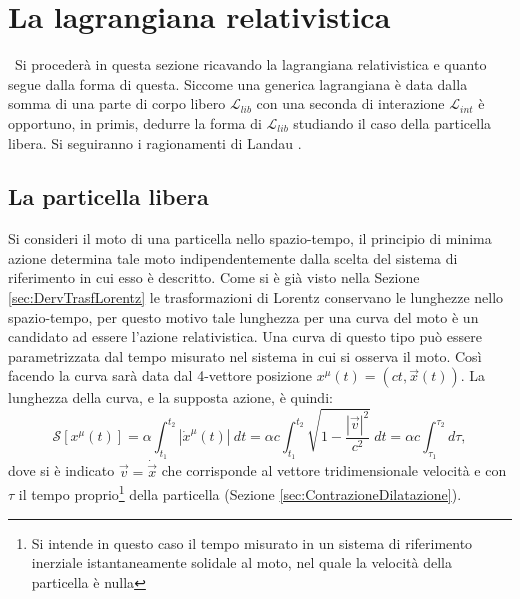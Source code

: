 \section{La lagrangiana relativistica}\
Si procederà in questa sezione ricavando la lagrangiana relativistica e quanto segue dalla forma di questa. Siccome una generica lagrangiana è data dalla somma di una parte di corpo libero $\mathcal{L}_{lib}$ con una seconda di interazione $\mathcal{L}_{int}$ è opportuno, in primis, dedurre la forma di $\mathcal{L}_{lib}$ studiando il caso della particella libera. Si seguiranno i ragionamenti di Landau \cite{Landau}.
\subsection{La particella libera}
Si consideri il moto di una particella nello spazio-tempo, il principio di minima azione determina tale moto indipendentemente dalla scelta del sistema di riferimento in cui esso è descritto.
Come si è già visto nella Sezione \ref{sec:DervTrasfLorentz} le trasformazioni di Lorentz conservano le lunghezze nello spazio-tempo, per questo motivo tale lunghezza per una curva del moto è un candidato ad essere l'azione relativistica. Una curva di questo tipo può essere parametrizzata dal tempo misurato nel sistema in cui si osserva il moto. Così facendo la curva sarà data dal 4-vettore posizione $x^\mu(t)=(ct,\vec{x}(t))$. La lunghezza della curva, e la supposta azione, è quindi:
\begin{equation}
    \label{azioneRel}
    \mathcal{S}[x^\mu(t)]=\alpha\int_{t_1}^{t_2} |\dot{x}^\mu(t)|\ dt= \alpha c\int_{t_1}^{t_2} \sqrt{1-\frac{|\vec{v}|^2}{c^2}}\ dt=\alpha c\int_{\tau_1}^{\tau_2}d\tau,
\end{equation}
dove si è indicato $\vec{v}=\dot{\vec{x}}$ che corrisponde al vettore tridimensionale velocità e con $\tau$ il tempo proprio\footnote{Si intende in questo caso il tempo misurato in un sistema di riferimento inerziale istantaneamente solidale al moto, nel quale la velocità della particella è nulla} della particella (Sezione \ref{sec:ContrazioneDilatazione}).\\

